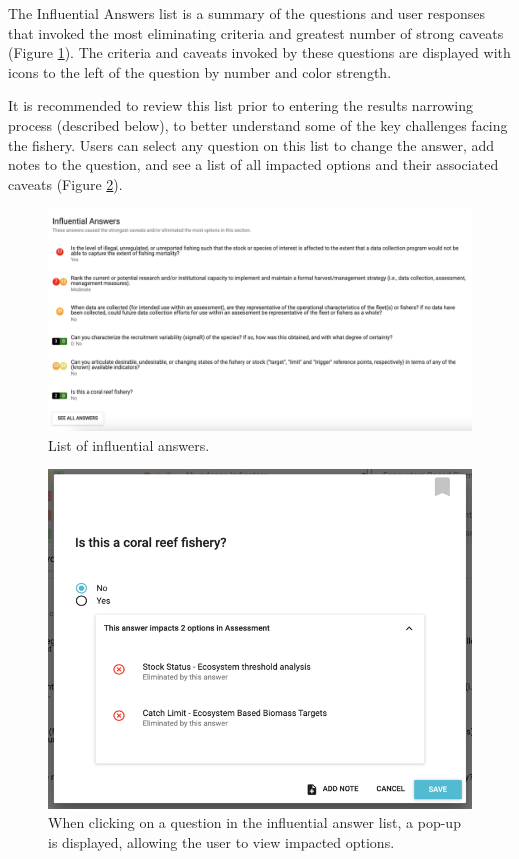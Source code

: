 \documentclass[
  11pt,
]{book}
\begin{document}
The Influential Answers list is a summary of the questions and user responses that invoked the most eliminating criteria and greatest number of strong caveats (Figure \ref{fig:influential-answers}). The criteria and caveats invoked by these questions are displayed with icons to the left of the question by number and color strength.

It is recommended to review this list prior to entering the results narrowing process (described below), to better understand some of the key challenges facing the fishery. Users can select any question on this list to change the answer, add notes to the question, and see a list of all impacted options and their associated caveats (Figure \ref{fig:influential-answers-expanded}).

\begin{figure}

{\centering \includegraphics[width=0.95\linewidth]{images/influential-answers} 

}

\caption{List of influential answers.}\label{fig:influential-answers}
\end{figure}

\begin{figure}

{\centering \includegraphics[width=0.75\linewidth]{images/influential-answers-expanded} 

}

\caption{When clicking on a question in the influential answer list, a pop-up is displayed, allowing the user to view impacted options.}\label{fig:influential-answers-expanded}
\end{figure}
\end{document}
